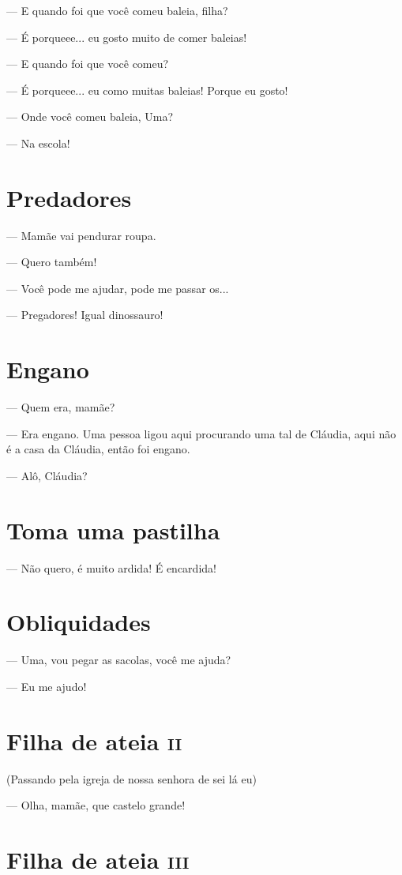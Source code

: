 — E quando foi que você comeu baleia, filha?

— É porqueee... eu gosto muito de comer baleias!

— E quando foi que você comeu?

— É porqueee... eu como muitas baleias! Porque eu gosto!

— Onde você comeu baleia, Uma?

— Na escola!

\chapter{Predadores}

— Mamãe vai pendurar roupa.

— Quero também!

— Você pode me ajudar, pode me passar os...

— Pregadores! Igual dinossauro!

\chapter{Engano}

— Quem era, mamãe?

— Era engano. Uma pessoa ligou aqui procurando uma tal de Cláudia, aqui
não é a casa da Cláudia, então foi engano.

— Alô, Cláudia?

\chapter{Toma uma pastilha}

— Não quero, é muito ardida! É encardida!

\chapter{Obliquidades}

— Uma, vou pegar as sacolas, você me ajuda?

— Eu me ajudo!

\chapter{Filha de ateia \textsc{ii}}

(Passando pela igreja de nossa senhora de sei lá eu)

— Olha, mamãe, que castelo grande!

\chapter{Filha de ateia \textsc{iii}}


